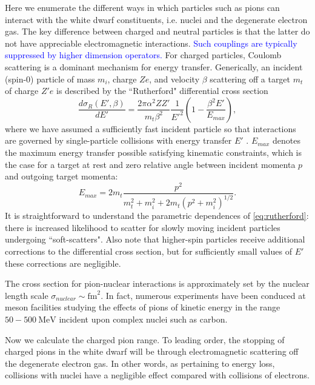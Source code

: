 \documentclass[11 pt, preprint,preprintnumbers,amsmath,amssymb, prd]{revtex4}
\def\r{\right)}
\def\l{\left(}
\begin{document}
Here we enumerate the different ways in which particles such as pions can interact with the white dwarf constituents, i.e. nuclei and the degenerate electron gas. The key difference between charged and neutral particles is that the latter do not have appreciable electromagnetic interactions. \textcolor{blue}{Such couplings are typically suppressed by higher dimension operators.} For charged particles, Coulomb scattering is a dominant mechanism for energy transfer. Generically, an incident (spin-0) particle of mass $m_i$, charge $Ze$, and velocity $\beta$ scattering off a target $m_t$ of charge $Z'e$ is described by the ``Rutherford" differential cross section
\begin{equation}
\label{eq:rutherford}
\frac{d \sigma_R (E', \beta)}{dE'} = \frac{2 \pi  \alpha^2 Z Z'}{m_t \beta^2} \frac{1}{E'^2} \l1- \frac{\beta^2 E'}{E_{max}}\r, 
 \end{equation}
where we have assumed a sufficiently fast incident particle so that interactions are governed by single-particle collisions with energy transfer $E'$ \cite{Rossi}. $E_{max}$ denotes the maximum energy transfer possible satisfying kinematic constraints, which is the case for a target at rest and zero relative angle between incident momenta $p$ and outgoing target momenta:
\begin{equation}
E_{max} = 2 m_t \frac{p^2}{m_t^2 + m_i^2 + 2m_t (p^2 +m_i^2)^{1/2}}. 
\end{equation}
It is straightforward to understand the parametric dependences of \eqref{eq:rutherford}: there is increased likelihood to scatter for slowly moving incident particles undergoing ``soft-scatters". Also note that higher-spin particles receive additional corrections to the differential cross section, but for sufficiently small values of $E'$ these corrections are negligible. 

 
The cross section for pion-nuclear interactions is approximately set by the nuclear length scale $\sigma_{nuclear} \sim \text{fm}^2$. In fact, numerous experiments have been conduced at meson facilities studying the effects of pions of kinetic energy in the range $50 - 500 ~\text{MeV}$ incident upon complex nuclei such as carbon. 




Now we calculate the charged pion range. To leading order, the stopping of charged pions in the white dwarf will be through electromagnetic scattering off the degenerate electron gas. In other words, as pertaining to energy loss, collisions with nuclei have a negligible effect compared with collisions of electrons. 
\end{document}
